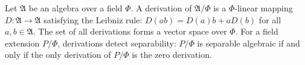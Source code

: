 Let $\mathfrak{A}$ be an algebra over a field $\Phi$. A derivation of $\mathfrak{A}/\Phi$ is a $\Phi$-linear mapping $D: \mathfrak{A} \to \mathfrak{A}$ satisfying the Leibniz rule: $D(ab) = D(a)b + aD(b)$ for all $a, b \in \mathfrak{A}$. The set of all derivations forms a vector space over $\Phi$. For a field extension $P/\Phi$, derivations detect separability: $P/\Phi$ is separable algebraic if and only if the only derivation of $P/\Phi$ is the zero derivation.
